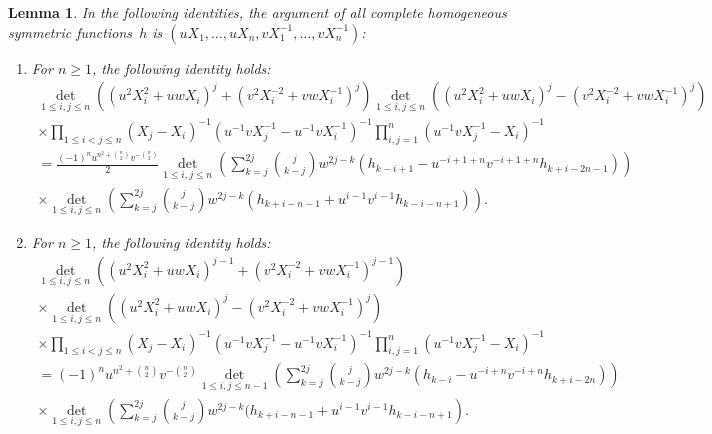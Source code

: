 \documentclass[12pt]{amsart}
\newtheorem{lemma}[theorem]{Lemma}
\theoremstyle{definition}
\numberwithin{equation}{section}
\begin{document}
\begin{lemma} 
	\label{jacobitrudi3lem}
	In the following identities, the argument of all complete homogeneous symmetric functions~$h$ is $(u X_1,\ldots,u X_n,v X_1^{-1},\ldots,v X_n^{-1})$:
	\begin{enumerate}
		\item\label{lem:jacobitrudi3lem1} For $n \ge 1$, the following identity holds: 
		\begin{multline*} 
				\det\limits_{1 \le i,j \le n} \left( \left(u^2 X_i^2 + u w X_i\right)^j + \left(v^2 X_i^{-2} + v w X_i^{-1}\right)^j \right)
				\det\limits_{1 \le i,j \le n} \left( \left(u^2 X_i^2 + u w X_i\right)^j - \left(v^2 X_i^{-2} + v w X_i^{-1}\right)^j \right)\\
			\times \prod_{1 \le i < j \le n} (X_j-X_i)^{-1} (u^{-1} v X_j^{-1}-u^{-1}v X_i^{-1})^{-1} 
				\prod_{i,j=1}^{n}  (u^{-1} v X_j^{-1}-X_i)^{-1} \\
			= \frac{(-1)^n u^{n^2+\binom{n}{2}} v^{-\binom{n}{2}}}{2} 
			\det_{1 \le i, j \le n } \left( \sum_{k=j}^{2j} \binom{j}{k-j} w^{2j-k}  \left( h_{k-i+1} - u^{-i+1+n} v^{-i+1+n} h_{k+i-2n-1} \right) \right) 
			\\
			\times \det_{1 \le i,j \le n} \left(  \sum_{k=j}^{2j} \binom{j}{k-j} w^{2j-k} 
			(h_{k+i-n-1} + u^{i-1} v^{i-1} h_{k-i-n+1} )  \right).
		\end{multline*} 
		\item\label{lem:jacobitrudi3lem2} For $n \ge 1$, the following identity holds:
		\begin{multline*}
			\det\limits_{1 \le i,j \le n} \left( \left(u^2 X_i^2 + u w X_i\right)^{j-1} + \left(v^2 X_i^{-2} + v w X_i^{-1}\right)^{j-1} \right) \\
			\times\det\limits_{1 \le i,j \le n} \left( \left(u^2 X_i^2 + u w X_i\right)^j - \left(v^2 X_i^{-2} + v w X_i^{-1}\right)^j \right) \\
			\times\prod_{1 \le i < j \le n} (X_j-X_i)^{-1} (u^{-1} v X_j^{-1}-u^{-1}v X_i^{-1})^{-1} 
			\prod_{i,j=1}^{n}  (u^{-1} v X_j^{-1}-X_i)^{-1}\\
			= (-1)^n u^{n^2+\binom{n}{2}} v^{-\binom{n}{2}} 
			\det_{1 \le i, j \le n-1 } \left( \sum_{k=j}^{2j} \binom{j}{k-j} w^{2j-k}  \left( h_{k-i} - u^{-i+n} v^{-i+n} 
			h_{k+i-2n} \right) \right) 
			\\
			\times 
			\det_{1 \le i,j \le n} \left(  \sum_{k=j}^{2j} \binom{j}{k-j} w^{2j-k} 
			(h_{k+i-n-1}+ u^{i-1} v^{i-1}  h_{k-i-n+1} \right).
		\end{multline*}
	\end{enumerate} 
\end{lemma} 
\end{document}
